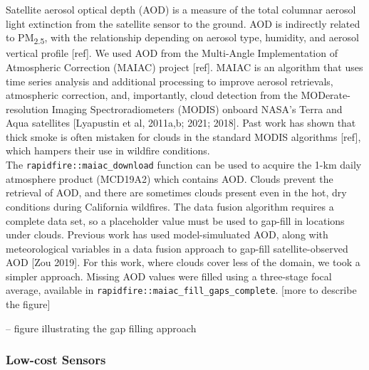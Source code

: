 \documentclass[gmd, manuscript]{copernicus}
\begin{document}
Satellite aerosol optical depth (AOD) is a measure of the total columnar
aerosol light extinction from the satellite sensor to the ground. AOD is
indirectly related to PM\textsubscript{2.5}, with the relationship
depending on aerosol type, humidity, and aerosol vertical profile
{[}ref{]}. We used AOD from the Multi-Angle Implementation of
Atmospheric Correction (MAIAC) project {[}ref{]}. MAIAC is an algorithm
that uses time series analysis and additional processing to improve
aerosol retrievals, atmospheric correction, and, importantly, cloud
detection from the MODerate-resolution Imaging Spectroradiometers
(MODIS) onboard NASA's Terra and Aqua satellites {[}Lyapustin et al,
2011a,b; 2021; 2018{]}. Past work has shown that thick smoke is often
mistaken for clouds in the standard MODIS algorithms {[}ref{]}, which
hampers their use in wildfire conditions.\\
The \texttt{rapidfire::maiac\_download} function can be used to acquire
the 1-km daily atmosphere product (MCD19A2) which contains AOD. Clouds
prevent the retrieval of AOD, and there are sometimes clouds present
even in the hot, dry conditions during California wildfires. The data
fusion algorithm requires a complete data set, so a placeholder value
must be used to gap-fill in locations under clouds. Previous work has
used model-simuluated AOD, along with meteorological variables in a data
fusion approach to gap-fill satellite-observed AOD {[}Zou 2019{]}. For
this work, where clouds cover less of the domain, we took a simpler
approach. Missing AOD values were filled using a three-stage focal
average, available in \texttt{rapidfire::maiac\_fill\_gaps\_complete}.
{[}more to describe the figure{]}

-- figure illustrating the gap filling approach

\subsubsection{Low-cost Sensors}
\end{document}
